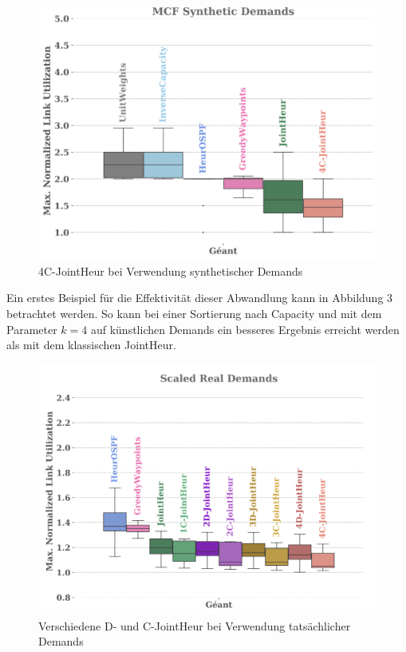 \documentclass[sigconf,noacm,review]{acmart}
\begin{document}
\begin{figure}[h]
  \centering 
  \includegraphics[width=\linewidth]{abbildungen/PNG-Bild}
  \caption{4C-JointHeur bei Verwendung synthetischer Demands}
 \end{figure}
Ein erstes Beispiel für die Effektivität dieser Abwandlung kann in Abbildung 3 betrachtet werden. So kann bei einer Sortierung nach Capacity und mit dem Parameter $k=4$ auf künstlichen Demands ein besseres Ergebnis erreicht werden als mit dem klassischen JointHeur. 
\begin{figure}[h]
  \centering 
  \includegraphics[width=\linewidth]{abbildungen/PNG-Bild 2}
  \caption{Verschiedene D- und C-JointHeur bei Verwendung tatsächlicher Demands}
\end{figure}
\end{document}
